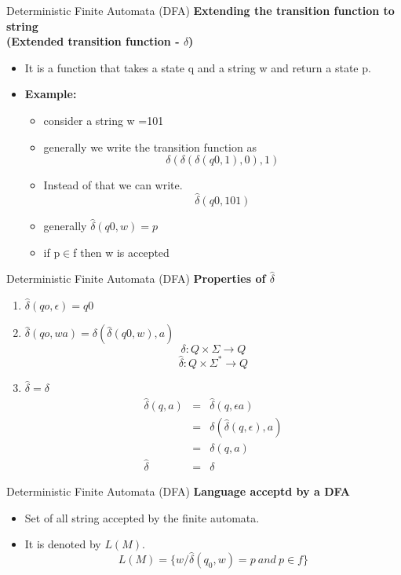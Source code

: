 \documentclass{beamer}
\begin{document}
\begin{frame}{Deterministic Finite Automata (DFA)}
	\textbf{Extending the transition function to string\\ (Extended transition function - $\hat{\delta}$)}
	\begin{itemize}
		\item It is a function that takes a state q and a string w and return a state p.
		\item \textbf{Example:}
		\begin{itemize}
			\item consider a string w =101
			\item generally we write the transition function as 
			$$\delta(\delta(\delta(q0,1),0),1)$$
			\item Instead of that we can write.
			$$\hat{\delta}(q0,101)$$
			\item generally $\hat{\delta}(q0,w)=p$
			\item if p$\in$f then w is accepted
		\end{itemize}
	\end{itemize}
\end{frame}
\begin{frame}{Deterministic Finite Automata (DFA)}
	\textbf{ Properties of $\hat{\delta}$}
	\begin{enumerate}
		\item $\hat{\delta}(qo,\epsilon)=q0$
		\item $\hat{\delta}(qo,wa)=\delta(\hat{\delta}(q0,w),a)$
		$$\delta: Q \times \Sigma\rightarrow Q$$
		$$\hat{\delta}: Q \times \Sigma^*\rightarrow Q$$
		\item $\hat{\delta}=\delta$
		\begin{eqnarray*}
			\hat{\delta}(q,a)&=&\hat{\delta}(q,\epsilon a)\\
		&=&\delta(\hat{\delta}(q,\epsilon),a)\\
			&=&\delta(q,a)\\
			\hat{\delta}&=&\delta
		\end{eqnarray*}
	\end{enumerate}
\end{frame}
\begin{frame}{Deterministic Finite Automata (DFA)}
	\textbf{Language acceptd by a DFA}
	\begin{itemize}
		\item Set of all string accepted by the finite automata.
		\item It is denoted by $L(M).$
		$$L(M)=\{w/\hat{\delta}(q_0,w)=p  \ and \ p \in f\}$$
	\end{itemize}
\end{frame}
\end{document}
